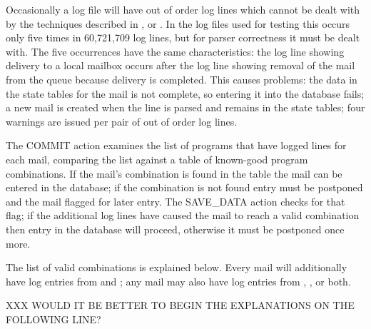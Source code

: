 Occasionally a log file will have out of order log lines which cannot be
dealt with by the techniques described in ,  or .  In the \numberOFlogFILES{} log files used for testing this
occurs only five times in 60,721,709 log lines, but for parser correctness
it must be dealt with.  The five occurrences have the same characteristics:
the  log line showing delivery to a local mailbox occurs
after the  log line showing removal of the mail from the queue
because delivery is completed.  This causes problems: the data in the state
tables for the mail is not complete, so entering it into the database
fails; a new mail is created when the  line is parsed and
remains in the state tables; four warnings are issued per pair of out of
order log lines.

The COMMIT action examines the list of programs that have logged lines for
each mail, comparing the list against a table of known-good program
combinations.  If the mail's combination is found in the table the mail can
be entered in the database; if the combination is not found entry must be
postponed and the mail flagged for later entry.  The SAVE\_DATA action
checks for that flag; if the additional log lines have caused the mail to
reach a valid combination then entry in the database will proceed,
otherwise it must be postponed once more.

The list of valid combinations is explained below.  Every mail will
additionally have log entries from  and ; any
mail may also have log entries from , , or
both.

XXX WOULD IT BE BETTER TO BEGIN THE EXPLANATIONS ON THE FOLLOWING LINE\@?

